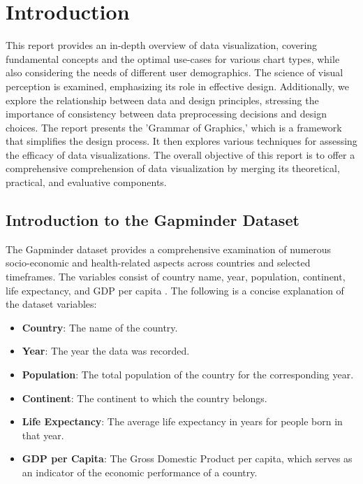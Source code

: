 \section{Introduction}

This report provides an in-depth overview of data visualization, covering fundamental concepts and the optimal use-cases for various chart types, while also considering the needs of different user demographics. The science of visual perception is examined, emphasizing its role in effective design. Additionally, we explore the relationship between data and design principles, stressing the importance of consistency between data preprocessing decisions and design choices. The report presents the 'Grammar of Graphics,' which is a framework that simplifies the design process. It then explores various techniques for assessing the efficacy of data visualizations. The overall objective of this report is to offer a comprehensive comprehension of data visualization by merging its theoretical, practical, and evaluative components.

\subsection{Introduction to the Gapminder Dataset}

The Gapminder dataset provides a comprehensive examination of numerous socio-economic and health-related aspects across countries and selected timeframes. The variables consist of country name, year, population, continent, life expectancy, and GDP per capita \cite{GapminderWorld}. The following is a concise explanation of the dataset variables:

\begin{itemize}
    \item \textbf{Country}: The name of the country.
    \item \textbf{Year}: The year the data was recorded.
    \item \textbf{Population}: The total population of the country for the corresponding year.
    \item \textbf{Continent}: The continent to which the country belongs.
    \item \textbf{Life Expectancy}: The average life expectancy in years for people born in that year.
    \item \textbf{GDP per Capita}: The Gross Domestic Product per capita, which serves as an indicator of the economic performance of a country.
\end{itemize}